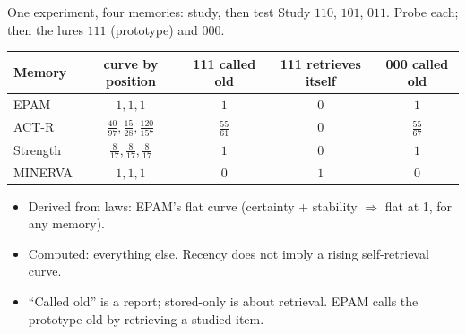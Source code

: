 \documentclass[aspectratio=169,11pt]{beamer}
\begin{document}
\begin{frame}{One experiment, four memories: study, then test}
  Study $110$, $101$, $011$. Probe each; then the lures $111$ (prototype) and $000$.
  \medskip
  \small
  \begin{center}
  \begin{tabular}{lcccc}
    \toprule
    Memory & curve by position & 111 called old & 111 retrieves itself & 000 called old\\
    \midrule
    EPAM & $1,1,1$ & $1$ & $0$ & $1$\\
    ACT-R & $\tfrac{40}{97},\tfrac{15}{28},\tfrac{120}{157}$ & $\tfrac{55}{61}$ & $0$ & $\tfrac{55}{67}$\\
    Strength & $\tfrac{8}{17},\tfrac{8}{17},\tfrac{8}{17}$ & $1$ & $0$ & $1$\\
    MINERVA & $1,1,1$ & $0$ & $1$ & $0$\\
    \bottomrule
  \end{tabular}
  \end{center}
  \medskip
  \normalsize
  \begin{itemize}\small
    \item Derived from laws: EPAM's flat curve (certainty + stability $\Rightarrow$ flat at 1, for any memory).
    \item Computed: everything else. Recency does not imply a rising self-retrieval curve.
    \item ``Called old'' is a report; stored-only is about retrieval. EPAM calls the prototype old by retrieving a studied item.
  \end{itemize}
\end{frame}
\end{document}
